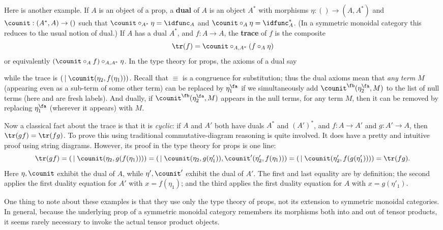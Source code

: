 Here is another example.
If $A$ is an object of a prop, a \textbf{dual} of $A$ is an object $A^*$ with morphisms $\eta:()\to (A,A^*)$ and $\counit:(A^*,A)\to ()$ such that $\counit \circ_{A^*} \eta = \idfunc_A$ and $\counit \circ_{A} \eta = \idfunc_A^*$.
(In a symmetric monoidal category this reduces to the usual notion of dual.)
If $A$ has a dual $A^*$, and $f:A\to A$, the \textbf{trace} of $f$ is the composite
\[ \tr(f) = \counit \circ_{A,A^*} (f \circ_A \eta) \]
or equivalently $(\counit \circ_A f)\circ_{A,A^*} \eta$.
In the type theory for props, the axioms of a dual say
while the trace is $(\,\mid \counit(\eta_2,f(\eta_1)))$.
Recall that $\equiv$ is a congruence for substitution; thus the dual axioms mean that \emph{any term} $M$ (appearing even as a sub-term of some other term) can be replaced by $\eta_1^\fa$ if we simultaneously add $\counit^\fb(\eta_2^\fa,M)$ to the list of null terms (here \fa and \fb are fresh labels).
And dually, if $\counit^\fb(\eta_2^\fa,M)$ appears in the null terms, for any term $M$, then it can be removed by replacing $\eta_1^\fa$ (wherever it appears) with $M$.

Now a classical fact about the trace is that it is \emph{cyclic}: if $A$ and $A'$ both have duals $A^*$ and $(A')^*$, and $f:A\to A'$ and $g:A'\to A$, then $\tr(gf) = \tr(fg)$.
To prove this using traditional commutative-diagram reasoning is quite involved.
It does have a pretty and intuitive proof using string diagrams.
However, its proof in the type theory for props is one line:
\[ \tr(gf) = (\,\mid \counit(\eta_2,g(f(\eta_1))))
= (\,\mid \counit(\eta_2,g(\eta'_1)),\counit'(\eta'_2,f(\eta_1)))
= (\,\mid \counit(\eta'_2,f(g(\eta'_1))))
= \tr(fg).
\]
Here $\eta,\counit$ exhibit the dual of $A$, while $\eta',\counit'$ exhibit the dual of $A'$.
The first and last equality are by definition;
the second applies the first duality equation for $A'$ with $x=f(\eta_1)$; and the third applies the first duality equation for $A$ with $x=g(\eta'_1)$.

One thing to note about these examples is that they use only the type theory of props, not its extension to symmetric monoidal categories.
In general, because the underlying prop of a symmetric monoidal category remembers its morphisms both into and out of tensor products, it seems rarely necessary to invoke the actual tensor product objects.

